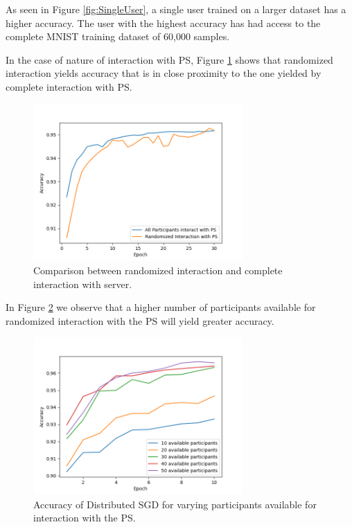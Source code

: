 \documentclass[conference]{IEEEtran}
\begin{document}
As seen in Figure \ref{fig:SingleUser}, a single user trained on a larger dataset has a higher accuracy. The user with the highest accuracy has had access to the complete MNIST training dataset of 60,000 samples. 




In the case of nature of interaction with PS, Figure \ref{fig:RandVsAll} shows that randomized interaction yields accuracy that is in close proximity to the one yielded by complete interaction with PS.


\begin{figure}[!h]
\includegraphics[width=8cm, keepaspectratio]{RandomVsAll}
\caption{Comparison between randomized interaction and complete interaction with server. }
\label{fig:RandVsAll}
\end{figure}


In Figure \ref{fig:VaryingPoolofParticipants} we observe that a higher number of participants available for randomized interaction with the PS will yield greater accuracy.

\begin{figure}[!h]
\includegraphics[width=8cm, keepaspectratio]{VaryingPoolofParticipants}
\caption{Accuracy of Distributed SGD for varying participants available for interaction with the PS.}
\label{fig:VaryingPoolofParticipants}
\end{figure}
\end{document}
